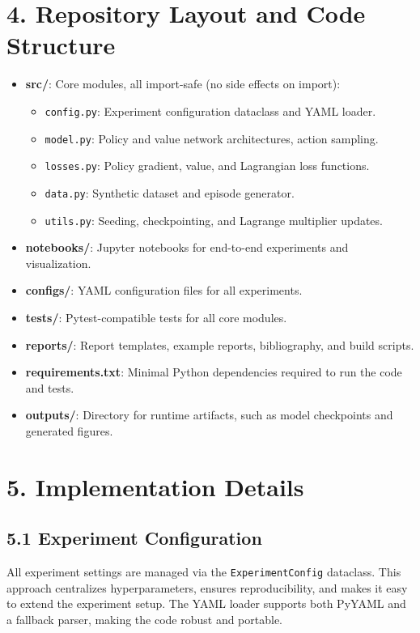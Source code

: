\documentclass[conference]{IEEEtran}
\begin{document}
\section*{4. Repository Layout and Code Structure}
\begin{itemize}
  \item \textbf{src/}: Core modules, all import-safe (no side effects on import):
    \begin{itemize}
      \item \texttt{config.py}: Experiment configuration dataclass and YAML loader.
      \item \texttt{model.py}: Policy and value network architectures, action sampling.
      \item \texttt{losses.py}: Policy gradient, value, and Lagrangian loss functions.
      \item \texttt{data.py}: Synthetic dataset and episode generator.
      \item \texttt{utils.py}: Seeding, checkpointing, and Lagrange multiplier updates.
    \end{itemize}
  \item \textbf{notebooks/}: Jupyter notebooks for end-to-end experiments and visualization.
  \item \textbf{configs/}: YAML configuration files for all experiments.
  \item \textbf{tests/}: Pytest-compatible tests for all core modules.
  \item \textbf{reports/}: Report templates, example reports, bibliography, and build scripts.
  \item \textbf{requirements.txt}: Minimal Python dependencies required to run the code and tests.
  \item \textbf{outputs/}: Directory for runtime artifacts, such as model checkpoints and generated figures.
\end{itemize}

\section*{5. Implementation Details}
\subsection*{5.1 Experiment Configuration}
All experiment settings are managed via the \texttt{ExperimentConfig} dataclass. This approach centralizes hyperparameters, ensures reproducibility, and makes it easy to extend the experiment setup. The YAML loader supports both PyYAML and a fallback parser, making the code robust and portable.
\end{document}

